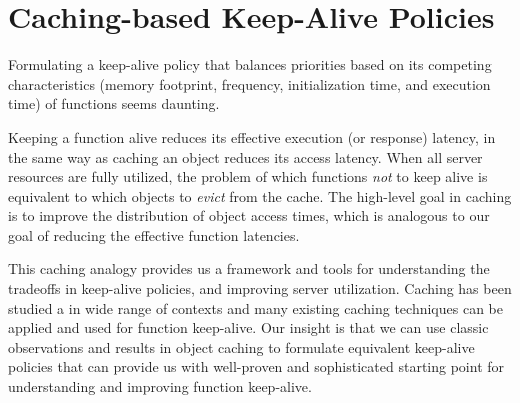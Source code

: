
\section{Caching-based Keep-Alive Policies}
\label{sec:cache-keep-alive}



Formulating a keep-alive policy that balances priorities based on its competing characteristics (memory footprint, frequency, initialization time, and execution time) of functions seems daunting. 

\begin{comment}
\begin{framed}
  \vspace*{-6pt}
  \noindent \emph{The central insight of this paper is that keeping functions alive is equivalent to keeping objects in a cache.}
  \vspace*{-6pt}
\end{framed}
\vspace*{-2pt}
\end{comment}

\noindent Keeping a function alive reduces its effective execution (or response) latency, in the same way as caching an object reduces its access latency. 
When all server resources are fully utilized, the problem of which functions \emph{not} to keep alive is equivalent to which objects to \emph{evict} from the cache. 
The high-level goal in caching is to improve the distribution of object access times, which is analogous to our goal of reducing the effective function latencies. 


This caching analogy provides us a framework and tools for understanding the tradeoffs in keep-alive policies, and improving server utilization. 
Caching has been studied a in wide range of contexts and many existing caching techniques can be applied and used for function keep-alive. 
Our insight is that we can use classic observations and results in object caching to formulate equivalent keep-alive policies that can provide us with well-proven and sophisticated starting point for understanding and improving function keep-alive.  


